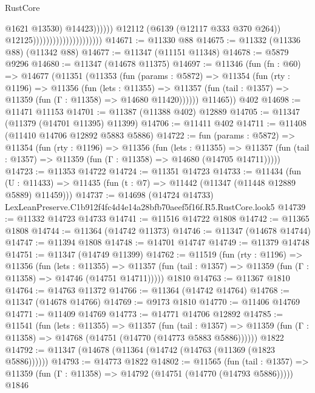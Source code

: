 \begin{lexlean}{RustCore}
\begin{coremodule}
                                                            @1621
                                                            @13530)
                                                          @14423))))))
                                              @12112
                                              (@6139 (@12117 @333 @370 @264))
                                              @12125)))))))))))))))))))))
@14671 := @11330 @88
@14675 := @11332 (@11336 @88) (@11342 @88)
@14677 := @11347 (@11151 @11348)
@14678 := @5879 @9296
@14680 := @11347 (@14678 @11375)
@14697 := @11346
    (fun (fn : @60) =>
    @14677
      (@11351
        (@11353
          (fun (params : @5872) =>
          @11354
            (fun (rty : @1196) =>
            @11356
              (fun (lets : @11355) =>
              @11357 (fun (tail : @1357) => @11359 (fun (Γ : @11358) => @14680 @11420))))))
        @11465))
    @402
@14698 := @11471 @11153
@14701 := @11387 (@11388 @402) @12889
@14705 := @11347 (@11379 (@14701 @11395) @11399)
@14706 := @11411 @402
@14711 := @11408 (@11410 @14706 @12892 @5883 @5886)
@14722 := fun (params : @5872) =>
  @11354
    (fun (rty : @1196) =>
    @11356
      (fun (lets : @11355) =>
      @11357 (fun (tail : @1357) => @11359 (fun (Γ : @11358) => @14680 (@14705 @14711)))))
@14723 := @11353 @14722
@14724 := @11351 @14723
@14733 := @11434
    (fun (U : @11433) => @11435 (fun (t : @7) => @11442 (@11347 (@11448 @12889 @5889) @11459)))
@14737 := @14698 (@14724 @14733) LexLeanPreserve.C1b912f4fc4d4e14a28bfb70aeef5f16f.R5.RustCore.look5
@14739 := @11332 @14723 @14733
@14741 := @11516 @14722 @1808
@14742 := @11365 @1808
@14744 := @11364 (@14742 @11373)
@14746 := @11347 (@14678 @14744)
@14747 := @11394 @1808
@14748 := @14701 @14747
@14749 := @11379 @14748
@14751 := @11347 (@14749 @11399)
@14762 := @11519
    (fun (rty : @1196) =>
    @11356
      (fun (lets : @11355) =>
      @11357 (fun (tail : @1357) => @11359 (fun (Γ : @11358) => @14746 (@14751 @14711)))))
    @1810
@14763 := @11367 @1810
@14764 := @14763 @11372
@14766 := @11364 (@14742 @14764)
@14768 := @11347 (@14678 @14766)
@14769 := @9173 @1810
@14770 := @11406 @14769
@14771 := @11409 @14769
@14773 := @14771 @14706 @12892
@14785 := @11541
    (fun (lets : @11355) =>
    @11357
      (fun (tail : @1357) =>
      @11359 (fun (Γ : @11358) => @14768 (@14751 (@14770 (@14773 @5883 @5886))))))
    @1822
@14792 := @11347 (@14678 (@11364 (@14742 (@14763 (@11369 (@1823 @5886))))))
@14793 := @14773 @1822
@14802 := @11565
    (fun (tail : @1357) => @11359 (fun (Γ : @11358) => @14792 (@14751 (@14770 (@14793 @5886)))))
    @1846

\end{coremodule}
\end{lexlean}
